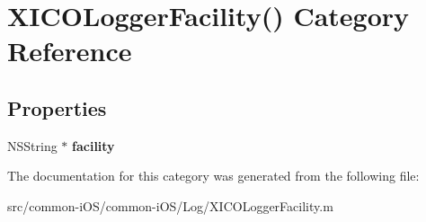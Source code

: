 \hypertarget{category_x_i_c_o_logger_facility_07_08}{}\section{X\+I\+C\+O\+Logger\+Facility() Category Reference}
\label{category_x_i_c_o_logger_facility_07_08}
\subsection*{Properties}
\begin{DoxyCompactItemize}
\item 
\hypertarget{category_x_i_c_o_logger_facility_07_08_a1aca6b2c2f8af320f08590dd75bd05d9}{}\label{category_x_i_c_o_logger_facility_07_08_a1aca6b2c2f8af320f08590dd75bd05d9} 
N\+S\+String $\ast$ {\bfseries facility}
\end{DoxyCompactItemize}


The documentation for this category was generated from the following file\+:\begin{DoxyCompactItemize}
\item 
src/common-\/i\+O\+S/common-\/i\+O\+S/\+Log/X\+I\+C\+O\+Logger\+Facility.\+m\end{DoxyCompactItemize}
